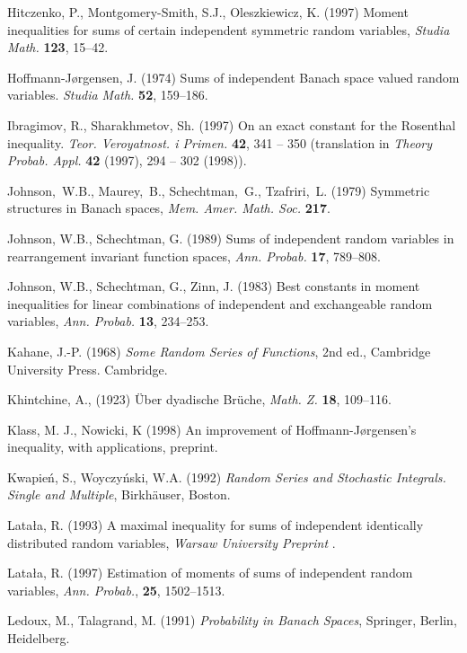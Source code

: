 \documentclass[12pt]{article}
\begin{document}
\begin{thebibliography}{99}
 Hitczenko, P., Montgomery-Smith, S.J., Oleszkiewicz, K.
(1997)
Moment inequalities for sums of certain independent symmetric random
variables, {\em Studia Math.} {\bf 123}, 15--42.

Hoffmann-J{\o}rgensen, J. (1974)
Sums of independent Banach space valued random variables. 
{\em Studia Math.} {\bf 52}, 159--186.

Ibragimov, R., Sharakhmetov, Sh. (1997) On an exact constant for the
Rosenthal inequality. {\em Teor. Veroyatnost. i Primen.} {\bf 42}, 341 --
350 (translation in {\em Theory Probab. Appl.} {\bf 42} (1997), 294 -- 302
(1998)).

 Johnson,~W.B., Maurey,~B.,  Schechtman,~G., Tzafriri,~L.
(1979)
Symmetric structures in Banach spaces, {\em Mem. 
Amer. Math. Soc.} {\bf 217}.

 Johnson, W.B., Schechtman, G. (1989) Sums of independent
random variables in rearrangement invariant function spaces, {\em
Ann. Probab.} {\bf 17}, 789--808.

  Johnson,  W.B., Schechtman,  G.,  Zinn, J. (1983)  Best
constants in moment inequalities for linear combinations of independent
and exchangeable random variables, {\em Ann. Probab.} {\bf  13}, 234--253.

 Kahane, J.-P. (1968) {\em Some Random Series of Functions},
2nd ed.,  Cambridge University Press. Cambridge. 

Khintchine, A., (1923)
\"Uber dyadische Br\"uche,
{\em Math. Z.} {\bf 18}, 109--116.

 Klass,
M. J., Nowicki, K (1998) An improvement of
Hoffmann-J{\o}rgensen's inequality, with applications,
preprint.

 Kwapie\'n, S., Woyczy\'nski, W.A. (1992) {\em
Random Series and Stochastic Integrals. Single and
Multiple}, Birkh\"auser, Boston.

 Lata{\l}a, R. (1993) A 
maximal inequality for sums of independent identically distributed
random variables, {\em Warsaw University Preprint }.

 Lata{\l}a, R. (1997) Estimation of moments of sums of 
independent
random
variables, {\em Ann. Probab.}, {\bf 25}, 1502--1513.

 Ledoux, M., Talagrand, M. (1991) {\em Probability in  Banach
Spaces}, Springer, Berlin, Heidelberg.


\end{thebibliography}
\end{document}
